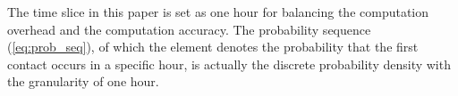 The time slice in this paper is set as one hour for
balancing the computation overhead and the computation accuracy.
The probability sequence (\ref{eq:prob_seq}),
of which the element denotes the probability
that the first contact occurs in a specific hour,
is actually the discrete probability density with the granularity of one hour.
%

